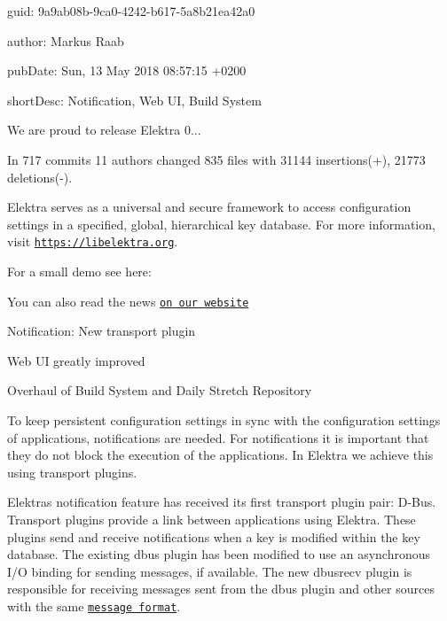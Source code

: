 
\begin{DoxyItemize}
\item guid\+: 9a9ab08b-\/9ca0-\/4242-\/b617-\/5a8b21ea42a0
\item author\+: Markus Raab
\item pub\+Date\+: Sun, 13 May 2018 08\+:57\+:15 +0200
\item short\+Desc\+: Notification, Web UI, Build System
\end{DoxyItemize}

We are proud to release Elektra 0...

In 717 commits 11 authors changed 835 files with 31144 insertions(+), 21773 deletions(-\/).

Elektra serves as a universal and secure framework to access configuration settings in a specified, global, hierarchical key database. For more information, visit \href{https://libelektra.org}{\tt https\+://libelektra.\+org}.

For a small demo see here\+:

\href{https://asciinema.org/a/cantr04assr4jkv8v34uz9b8r}{\tt }

You can also read the news \href{https://www.libelektra.org/news/0.8.23-release}{\tt on our website}


\begin{DoxyItemize}
\item Notification\+: New transport plugin
\item Web UI greatly improved
\item Overhaul of Build System and Daily Stretch Repository
\end{DoxyItemize}

To keep persistent configuration settings in sync with the configuration settings of applications, notifications are needed. For notifications it is important that they do not block the execution of the applications. In Elektra we achieve this using transport plugins.

Elektra\textquotesingle{}s notification feature has received its first transport plugin pair\+: D-\/\+Bus. Transport plugins provide a link between applications using Elektra. These plugins send and receive notifications when a key is modified within the key database. The existing {\ttfamily dbus} plugin has been modified to use an asynchronous I/O binding for sending messages, if available. The new {\ttfamily dbusrecv} plugin is responsible for receiving messages sent from the {\ttfamily dbus} plugin and other sources with the same \href{https://www.libelektra.org/plugins/dbus#notification-format}{\tt message format}.

